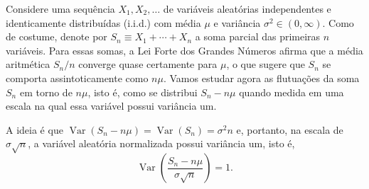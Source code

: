 \documentclass[12pt,portuguese]{article}
\theoremstyle{definition}
\theoremstyle{plainexercise}
\theoremstyle{starredexercise}
\theoremstyle{definition}
\begin{document}
Considere uma sequência $X_1,X_2,\ldots$ de variáveis aleatórias independentes
e identicamente distribuídas (i.i.d.) com média $\mu$ e variância $\sigma^2\in(0,\infty)$.
Como de costume, denote por $S_n\equiv X_1+\cdots+X_n$ a soma parcial das primeiras $n$ variáveis.
Para essas somas, a Lei Forte dos Grandes Números afirma que a
média aritmética $S_n/n$ converge quase certamente para $\mu$,
o que sugere que $S_n$ se comporta assintoticamente como $n\mu$.
Vamos estudar agora as flutuações da soma
$S_n$ em torno de $n\mu$, isto é, como se distribui $S_n-n\mu$ quando medida em uma escala
na qual essa variável possui variância um.

A ideia é que $\operatorname{Var}(S_n-n\mu) = \operatorname{Var}(S_n) = \sigma^2 n$
e, portanto, na escala de $\sigma\sqrt{n}$, a variável aleatória
normalizada possui variância um, isto é,
\[
\operatorname{Var}\left( \frac{S_n-n\mu}{\sigma \sqrt{n}}\right) = 1.
\]
\end{document}
